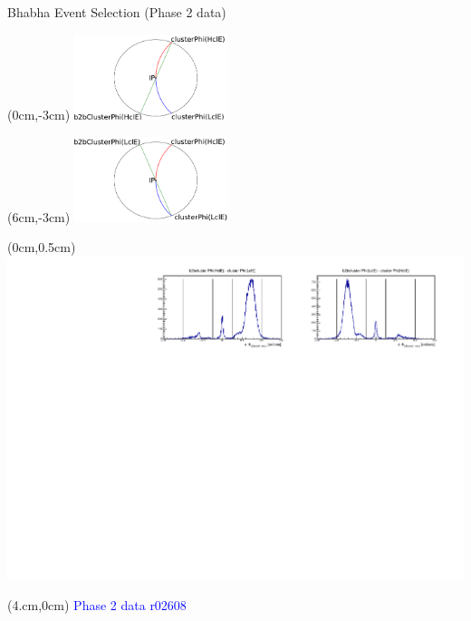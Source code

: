 \documentclass[8pt]{beamer}
\begin{document}
	
\begin{frame}{Bhabha Event Selection (Phase 2 data)}
	
	\begin{textblock*}{0.5\textwidth}(0cm,-3cm)
		\centering
		\includegraphics[width=4.5cm]{Plots/b2b_2}
	\end{textblock*}
	
	\begin{textblock*}{0.5\textwidth}(6cm,-3cm)
		\centering
		\includegraphics[width=4.5cm]{Plots/b2b_3}
	\end{textblock*}
	
	
	\begin{textblock*}{1\textwidth}(0cm,0.5cm)
		\centering
		\includegraphics[width=\textwidth]{Plots/Eff/b2b_Data.pdf}
	\end{textblock*}
	
	
	
	

		\begin{textblock*}{0.3\textwidth}(4.cm,0cm)
		\textcolor{blue}{Phase 2 data}		
		\textcolor{blue}{r02608}
	\end{textblock*}
	

	
	
	
	
	
\end{frame}
	
\end{document}
